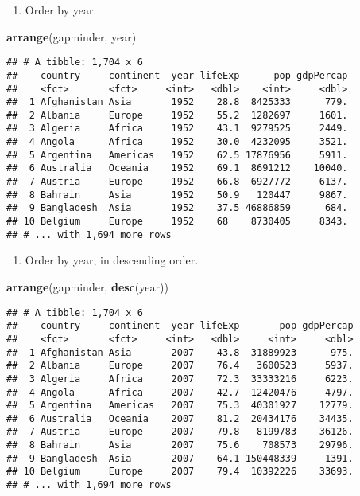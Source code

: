 \documentclass[]{article}
\newenvironment{Shaded}{\begin{snugshade}}{\end{snugshade}}
\newcommand{\KeywordTok}[1]{\textcolor[rgb]{0.13,0.29,0.53}{\textbf{{#1}}}}
\newcommand{\NormalTok}[1]{{#1}}
\providecommand{\tightlist}{%
  \setlength{\itemsep}{0pt}\setlength{\parskip}{0pt}}
\begin{document}
\begin{enumerate}
\def\labelenumi{\arabic{enumi}.}
\tightlist
\item
  Order by year.
\end{enumerate}

\begin{Shaded}
\begin{Highlighting}[]
\KeywordTok{arrange}\NormalTok{(gapminder, year)}
\end{Highlighting}
\end{Shaded}

\begin{verbatim}
## # A tibble: 1,704 x 6
##    country     continent  year lifeExp      pop gdpPercap
##    <fct>       <fct>     <int>   <dbl>    <int>     <dbl>
##  1 Afghanistan Asia       1952    28.8  8425333      779.
##  2 Albania     Europe     1952    55.2  1282697     1601.
##  3 Algeria     Africa     1952    43.1  9279525     2449.
##  4 Angola      Africa     1952    30.0  4232095     3521.
##  5 Argentina   Americas   1952    62.5 17876956     5911.
##  6 Australia   Oceania    1952    69.1  8691212    10040.
##  7 Austria     Europe     1952    66.8  6927772     6137.
##  8 Bahrain     Asia       1952    50.9   120447     9867.
##  9 Bangladesh  Asia       1952    37.5 46886859      684.
## 10 Belgium     Europe     1952    68    8730405     8343.
## # ... with 1,694 more rows
\end{verbatim}

\begin{enumerate}
\def\labelenumi{\arabic{enumi}.}
\setcounter{enumi}{1}
\tightlist
\item
  Order by year, in descending order.
\end{enumerate}

\begin{Shaded}
\begin{Highlighting}[]
\KeywordTok{arrange}\NormalTok{(gapminder, }\KeywordTok{desc}\NormalTok{(year))}
\end{Highlighting}
\end{Shaded}

\begin{verbatim}
## # A tibble: 1,704 x 6
##    country     continent  year lifeExp       pop gdpPercap
##    <fct>       <fct>     <int>   <dbl>     <int>     <dbl>
##  1 Afghanistan Asia       2007    43.8  31889923      975.
##  2 Albania     Europe     2007    76.4   3600523     5937.
##  3 Algeria     Africa     2007    72.3  33333216     6223.
##  4 Angola      Africa     2007    42.7  12420476     4797.
##  5 Argentina   Americas   2007    75.3  40301927    12779.
##  6 Australia   Oceania    2007    81.2  20434176    34435.
##  7 Austria     Europe     2007    79.8   8199783    36126.
##  8 Bahrain     Asia       2007    75.6    708573    29796.
##  9 Bangladesh  Asia       2007    64.1 150448339     1391.
## 10 Belgium     Europe     2007    79.4  10392226    33693.
## # ... with 1,694 more rows
\end{verbatim}
\end{document}
